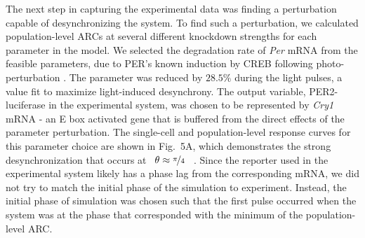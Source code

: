 \documentclass[11pt, letterpaper]{article}
\providecommand{\DIFadd}[1]{{\protect\color{blue}#1}} %
\providecommand{\DIFdel}[1]{{\protect\color{red}}}                      %
\providecommand{\DIFaddbegin}{} %
\providecommand{\DIFaddend}{} %
\providecommand{\DIFdelbegin}{} %
\providecommand{\DIFdelend}{} %
\begin{document}
\DIFadd{The next step in capturing the experimental data was finding a perturbation capable of desynchronizing the system.
To find such a perturbation, we calculated population-level ARCs at several different knockdown strengths for each parameter in the model.
We selected the }\DIFaddend degradation rate of {\itshape Per} mRNA \DIFdelbegin \DIFdel{was
chosen at a suitable parameter}\DIFdelend \DIFaddbegin \DIFadd{from the feasible parameters}\DIFaddend , due to \DIFdelbegin \DIFdel{its ability to desynchronize the
population and }\DIFdelend PER's known induction by CREB following photo-perturbation \cite{Tischkau2003}.
The parameter was reduced by $28.5\%$ during the light pulses, a value fit to maximize light-induced desynchrony.
The output variable, PER2-luciferase in the experimental system, was chosen to be represented by {\itshape Cry1} mRNA - an E box activated gene \DIFdelbegin \DIFdel{which }\DIFdelend \DIFaddbegin \DIFadd{that }\DIFaddend is buffered from the direct effects of the parameter perturbation.
\DIFaddbegin \DIFadd{The single-cell and population-level response curves for this parameter choice are shown in Fig.~5A, which demonstrates the strong desynchronization that occurs at \mbox{%
$\theta\approx\nicefrac{\pi}{4}$
}%
.
Since the reporter used in the experimental system likely has a phase lag from the corresponding mRNA, we did not try to match the initial phase of the simulation to experiment.
Instead, the initial phase of simulation was chosen such that the first pulse occurred when the system was at the phase that corresponded with the minimum of the population-level ARC.
}\DIFaddend 
\end{document}
